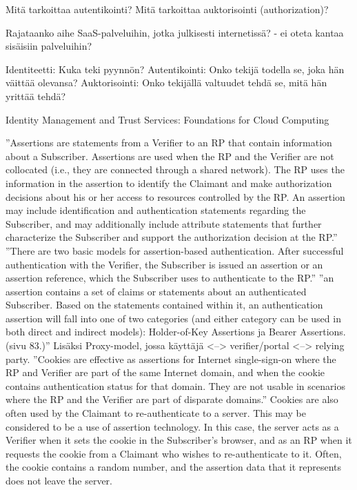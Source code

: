 \documentclass[finnish,gradu]{tktltiki}
\begin{document}
  Mitä tarkoittaa autentikointi?
  Mitä tarkoittaa auktorisointi (authorization)?

  Rajataanko aihe SaaS-palveluihin, jotka julkisesti internetissä?
  - ei oteta kantaa sisäisiin palveluihin?

  Identiteetti: Kuka teki pyynnön?
  Autentikointi: Onko tekijä todella se, joka hän väittää olevansa?
  Auktorisointi: Onko tekijällä valtuudet tehdä se, mitä hän yrittää tehdä?

  Identity Management and Trust Services: Foundations for Cloud Computing

  ''Assertions are statements from a Verifier to an RP that contain information about a
  Subscriber. Assertions are used when the RP and the Verifier are not collocated (i.e., they
  are connected through a shared network). The RP uses the information in the assertion to
  identify the Claimant and make authorization decisions about his or her access to
  resources controlled by the RP. An assertion may include identification and
  authentication statements regarding the Subscriber, and may additionally include attribute
  statements that further characterize the Subscriber and support the authorization decision
  at the RP.''
  ''There are two basic models for assertion-based authentication. After successful
  authentication with the Verifier, the Subscriber is issued an assertion or an assertion
  reference, which the Subscriber uses to authenticate to the RP.''
  ''an assertion contains a set of claims or statements about an
  authenticated Subscriber. Based on the statements contained within it, an authentication
  assertion will fall into one of two categories (and either category can be used in both
  direct and indirect models): Holder-of-Key Assertions ja Bearer Assertions. (sivu 83.)''
  Lisäksi Proxy-model, jossa käyttäjä <--> verifier/portal <--> relying party.
  ''Cookies are effective as assertions for Internet single-sign-on where the RP and Verifier
  are part of the same Internet domain, and when the cookie contains authentication status
  for that domain. They are not usable in scenarios where the RP and the Verifier are part
  of disparate domains.''
  Cookies are also often used by the Claimant to re-authenticate to a server. This may be
  considered to be a use of assertion technology. In this case, the server acts as a Verifier
  when it sets the cookie in the Subscriber’s browser, and as an RP when it requests the
  cookie from a Claimant who wishes to re-authenticate to it. Often, the cookie contains a
  random number, and the assertion data that it represents does not leave the server.
\end{document}
